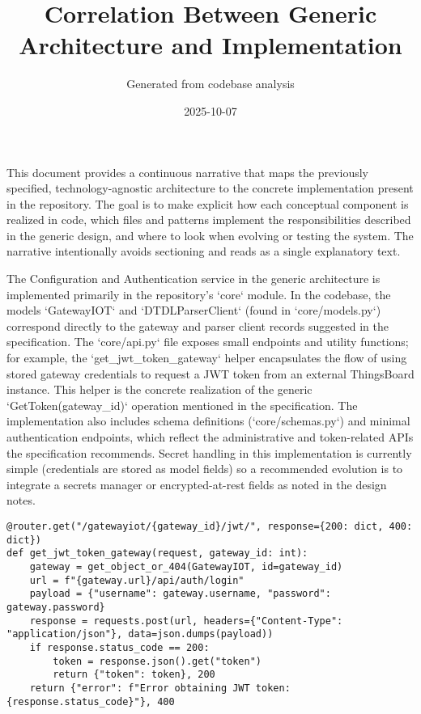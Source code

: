 \documentclass[11pt,a4paper]{article}
\title{Correlation Between Generic Architecture and Implementation}
\author{Generated from codebase analysis}
\date{2025-10-07}
\begin{document}
\maketitle
This document provides a continuous narrative that maps the previously specified, technology-agnostic architecture to the concrete implementation present in the repository. The goal is to make explicit how each conceptual component is realized in code, which files and patterns implement the responsibilities described in the generic design, and where to look when evolving or testing the system. The narrative intentionally avoids sectioning and reads as a single explanatory text.

The Configuration and Authentication service in the generic architecture is implemented primarily in the repository's `core` module. In the codebase, the models `GatewayIOT` and `DTDLParserClient` (found in `core/models.py`) correspond directly to the gateway and parser client records suggested in the specification. The `core/api.py` file exposes small endpoints and utility functions; for example, the `get_jwt_token_gateway` helper encapsulates the flow of using stored gateway credentials to request a JWT token from an external ThingsBoard instance. This helper is the concrete realization of the generic `GetToken(gateway_id)` operation mentioned in the specification. The implementation also includes schema definitions (`core/schemas.py`) and minimal authentication endpoints, which reflect the administrative and token-related APIs the specification recommends. Secret handling in this implementation is currently simple (credentials are stored as model fields) so a recommended evolution is to integrate a secrets manager or encrypted-at-rest fields as noted in the design notes.

\begin{lstlisting}[style=pythonstyle,caption={get_jwt_token_gateway (core/api.py) - simplified}]
@router.get("/gatewayiot/{gateway_id}/jwt/", response={200: dict, 400: dict})
def get_jwt_token_gateway(request, gateway_id: int):
	gateway = get_object_or_404(GatewayIOT, id=gateway_id)
	url = f"{gateway.url}/api/auth/login"
	payload = {"username": gateway.username, "password": gateway.password}
	response = requests.post(url, headers={"Content-Type": "application/json"}, data=json.dumps(payload))
	if response.status_code == 200:
		token = response.json().get("token")
		return {"token": token}, 200
	return {"error": f"Error obtaining JWT token: {response.status_code}"}, 400
\end{lstlisting}
\end{document}
